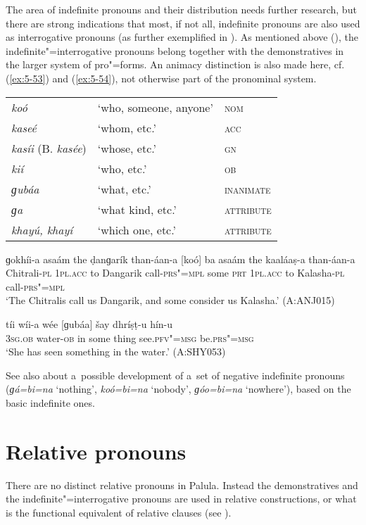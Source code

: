 The area of indefinite pronouns and their distribution needs further research, but there are strong indications that most, if not all, indefinite pronouns are also used as interrogative pronouns (as further exemplified in ). As mentioned above (), the indefinite"=interrogative pronouns belong together with the demonstratives in the larger system of pro"=forms. An animacy distinction is also made here, cf. (\ref{ex:5-53}) and (\ref{ex:5-54}), not otherwise part of the pronominal system.

\begin{table}[H]
\begin{tabularx}{\textwidth}{ l l l }
\textit{koó} &
`who, someone, anyone' &
\textsc{nom} \\
\textit{kaseé} &
`whom, etc.' &
\textsc{acc}\\
\textit{kasíi} (B. \textit{kasée}) &
`whose, etc.' &
\textsc{gn} \\
\textit{kií} &
`who, etc.' &
\textsc{ob} \\
\textit{ɡubáa} &
`what, etc.' &
\textsc{inanimate} \\
\textit{ɡa} &
`what kind, etc.' &
\textsc{attribute} \\
\textit{khayú, khayí} &
`which one, etc.' &
\textsc{attribute} \\
\end{tabularx}
\end{table}


\begin{exe}
\ex
\label{ex:5-53}
\gll ɡokhíi-a asaám the ḍanɡarík than-áan-a [koó] ba asaám the kaaláaṣ-a than-áan-a\\
Chitrali-\textsc{pl} \textsc{1pl.acc} to Dangarik call-\textsc{prs"=mpl} some \textsc{prt} \textsc{1pl.acc} to Kalasha-\textsc{pl} call-\textsc{prs"=mpl}\\
\glt `The Chitralis call us Dangarik, and some consider us Kalasha.' (A:ANJ015)

\ex
\label{ex:5-54}
\gll tíi wíi-a wée [ɡubáa] šay dhríṣṭ-u hín-u\\
\textsc{3sg.ob} water-\textsc{ob} in some thing see.\textsc{pfv"=msg} be.\textsc{prs"=msg}\\
\glt `She has seen something in the water.' (A:SHY053)
\end{exe}


See also  about a~possible development of a~set of negative indefinite pronouns (\textit{ɡá=bi=na} `nothing', \textit{koó=bi=na} `nobody', \textit{ɡóo=bi=na} `nowhere'), based on the basic indefinite ones.

\section{Relative pronouns}
\label{sec:5-8}


There are no distinct relative pronouns in Palula. Instead the demonstratives and the indefinite"=interrogative pronouns are used in relative constructions, or what is the functional equivalent of relative clauses (see ).